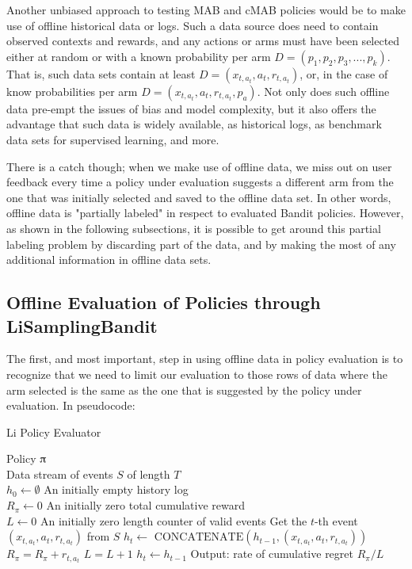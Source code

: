 \documentclass{jss}\usepackage[]{graphicx}\usepackage[]{color}
\begin{document}
Another unbiased approach to testing MAB and cMAB policies would be to make use of offline historical data or logs. Such a data source does need to contain observed contexts and rewards, and any actions or arms must have been selected either at random or with a known probability per arm \( D = (p_1,p_2,p_3,...,p_k) \). That is, such data sets contain at least \( D = (x_{t,a_t},a_{t},r_{t,a_t}) \), or, in the case of know probabilities per arm \( D = (x_{t,a_t},a_{t},r_{t,a_t},p_a) \). Not only does such offline data pre-empt the issues of bias and model complexity, but it also offers the advantage that such data is widely available, as historical logs, as benchmark data sets for supervised learning, and more.

There is a catch though; when we make use of offline data, we miss out on user feedback every time a policy under evaluation suggests a different arm from the one that was initially selected and saved to the offline data set. In other words, offline data is "partially labeled" in respect to evaluated Bandit policies. However, as shown in the following subsections, it is possible to get around this partial labeling problem by discarding part of the data, and by making the most of any additional information in offline data sets.

\subsection{Offline Evaluation of Policies through LiSamplingBandit}

The first, and most important, step in using offline data in policy evaluation is to recognize that we need to limit our evaluation to those rows of data where the arm selected is the same as the one that is suggested by the policy under evaluation. In pseudocode:

\begin{algorithm}[H]
\caption{Li Policy Evaluator}
\label{Alg:LiBandit}
\begin{algorithmic}
\REQUIRE  Policy $\piup$ \\
                 Data stream of events $S$ of length $T$  \\
                 $h_0 \leftarrow \emptyset$ {An initially empty history log}\\
                 $R_\pi \leftarrow 0$ {An initially zero total cumulative reward}\\
                 $L \leftarrow 0$ {An initially zero length counter of valid events}
	\STATE Get the $t$-th event \( (x_{t,a_t},a_{t},r_{t,a_t}) \) from  $S$
	       \STATE $h_{t} \leftarrow $  \(\textrm{CONCATENATE}\left( h_{t-1},(x_{t,a_t},a_{t},r_{t,a_t})  \right)\)
	       \STATE $R_\pi = R_\pi + r_{t,a_t}$
	       \STATE $L = L + 1$
	\ELSE
	        \STATE $h_{t} \leftarrow  h_{t-1} $
	\ENDIF
\ENDFOR
\STATE Output: rate of cumulative regret $R_\pi / L $
\end{algorithmic}
\end{algorithm}
\end{document}
